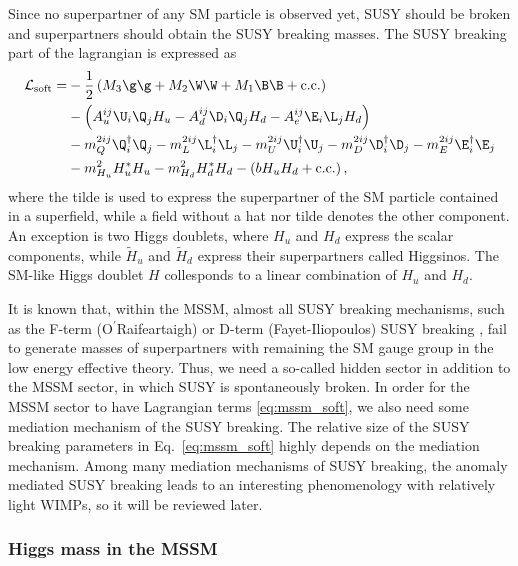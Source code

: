 \documentclass[12pt,twoside,book]{article}
\begin{document}
Since no superpartner of any SM particle is observed yet, SUSY should be broken and superpartners should obtain the SUSY breaking masses.  
The SUSY breaking part of the lagrangian is expressed as
\begin{align}
  \mathcal{L}_{\mathrm{soft}} =&
  -\frac{1}{2} \left( M_3 \g \g + M_2 \W \W + M_1 \B \B + \mathrm{c.c.} \right) \notag \\&
  -\left( A_u^{ij} \U_i \Q_j H_u - A_d^{ij} \D_i \Q_j H_d - A_e^{ij} \E_i \L_j H_d \right) \notag \\&
  -m_Q^{2ij} \Q^\dagger_i \Q_j - m_L^{2ij} \L^\dagger_i \L_j - m_U^{2ij} \U^\dagger_i \U_j
  -m_D^{2ij} \D^\dagger_i \D_j - m_E^{2ij} \E^\dagger_i \E_j \notag \\&
  -m_{H_u}^2 H_u^{*} H_u - m_{H_d}^2 H_d^{*} H_d - \left( b H_u H_d + \mathrm{c.c.} \right),
  \label{eq:mssm_soft}
\end{align}
where the tilde is used to express the superpartner of the SM particle contained in a superfield, while a field without a hat nor tilde denotes the other component.
An exception is two Higgs doublets, where $H_u$ and $H_d$ express the scalar components, while $\tilde{H}_u$ and $\tilde{H}_d$ express their superpartners called Higgsinos.
The SM-like Higgs doublet $H$ collesponds to a linear combination of $H_u$ and $H_d$.

It is known that, within the MSSM, almost all SUSY breaking mechanisms, such as the F-term (O$^{\mathrm{\prime}}$Raifeartaigh) \cite{ORaifeartaigh:1975nky} or D-term (Fayet-Iliopoulos) SUSY breaking \cite{Fayet:1974jb, Fayet:1974pd}, fail to generate masses of superpartners with remaining the SM gauge group in the low energy effective theory.
Thus, we need a so-called hidden sector in addition to the MSSM sector, in which SUSY is spontaneously broken.
In order for the MSSM sector to have Lagrangian terms \eqref{eq:mssm_soft}, we also need some mediation mechanism of the SUSY breaking.
The relative size of the SUSY breaking parameters in Eq.~\eqref{eq:mssm_soft} highly depends on the mediation mechanism.
Among many mediation mechanisms of SUSY breaking, the anomaly mediated SUSY breaking \cite{Giudice:1998xp, Randall:1998uk} leads to an interesting phenomenology with relatively light WIMPs, so it will be reviewed later.

\subsubsection*{Higgs mass in the MSSM}
\end{document}
